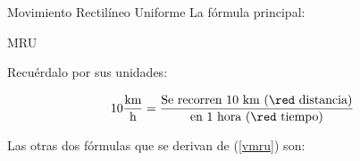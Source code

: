 \documentclass[%
final,
total,
slideBW,
colorBG,
pdf,
accumulate,
]{prosper}
\begin{document}
\begin{slide}{Movimiento Rectil\'ineo Uniforme}
% 
 La f\'ormula principal:

                                                               
 
{\huge \vmru}
\vNUa
                                                               
                                                               
                                                               
                                                               
\end{slide}
\begin{slide}{MRU}
% 

Recu\'erdalo por sus unidades:


\begin{equation*}
10\frac{\text{km}}{\text{h}} =
\frac{\text{Se recorren 10 km ({\red distancia})}}
{\text{en 1 hora ({\red tiempo})}}
\end{equation*}
                                                               
 
Las otras dos f\'ormulas que se derivan de (\ref{vmru}) son:

{\large \xmru \\ \tmru}
                                                              
\end{slide}
\end{document}
